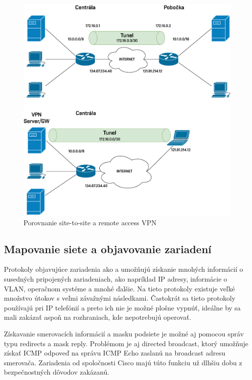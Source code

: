 \begin{figure}[H]
	\begin{center}
		\includegraphics[scale=0.6]{obrazky/tunnels.pdf}
	\end{center}
	\caption[Porovnanie site-to-site a remote access VPN]{Porovnanie site-to-site a remote access VPN}
	\label{fig:tunnel}
\end{figure} 


\subsection*{Mapovanie siete a objavovanie zariadení}
Protokoly objavujúce zariadenia ako  a  umožňujú získanie mnohých informácií o susedných pripojených zariadeniach, ako napríklad IP adresy, informácie o VLAN, operačnom systéme a mnohé ďalšie. Na tieto protokoly existuje veľké množstvo útokov s veľmi závažnými následkami. Častokrát sa tieto protokoly používajú pri IP telefónií a preto ich nie je možné plošne vypnúť, ideálne by sa mali zakázať aspoň na rozhraniach, kde nepotrebujú operovať. 

Získavanie smerovacích informácií a masku podsiete je možné aj pomocou správ  typu redirects a mask reply. Problémom je aj directed broadcast, ktorý umožňuje získať ICMP odpoveď na správu ICMP Echo zaslanú na broadcast adresu smerovača. Zariadenia od spoločnosti Cisco majú túto funkciu už dlhšiu dobu z bezpečnostných dôvodov zakázanú. 

